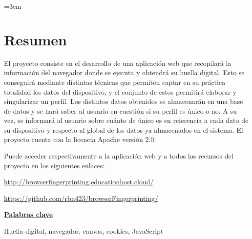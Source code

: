 \parindent=3em
\chapter*{Resumen}

El proyecto consiste en el desarrollo de una aplicación web que recopilará la información del navegador donde se ejecuta y obtendrá su huella digital. Esto se conseguirá mediante distintas técnicas que permiten captar en su práctica totalidad los datos del dispositivo, y el conjunto de estos permitirá elaborar y singularizar un perfil. Los distintos datos obtenidos se almacenarán en una base de datos y se hará saber al usuario en cuestión si su perfil es único o no. A su vez, se informará al usuario sobre cuánto de único es en referencia a cada dato de su dispositivo y respecto al global de los datos ya almacenados en el sistema. El proyecto cuenta con la licencia Apache versión 2.0. \par

\noindent
Puede acceder respectivamente a la aplicación web y a todos los recursos del proyecto en los siguientes enlaces: \par
\url{http://browserfingerprinting.educationhost.cloud/} \par

\url{https://github.com/rbn423/browserFingerprinting/} \par

\vspace{12mm}
\noindent
\underline{\Large{\textbf{Palabras clave}}}\par
\vspace{7mm}
\noindent
\normalsize{Huella digital, navegador, canvas, cookies, JavaScript}
